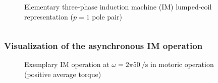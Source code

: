 \begin{frame}
\begin{columns}
\begin{column}{0.45\textwidth}
\begin{figure}
                \caption{Elementary three-phase induction machine (IM) lumped-coil representation ($p=1$ pole pair)}
                \label{fig:Simple_three_phase_induction_machine_lumped_coils}
            \end{figure}
        \end{column}
    \end{columns}
\end{frame}

\begin{frame}
	\frametitle{Visualization of the asynchronous IM operation}
    \vspace{-0.275cm}
    \begin{figure}
        \centering
        \vspace{-0.25cm}
        \caption{Exemplary IM operation at $\omega=2 \pi \SI{50}{\per\second}$ in motoric operation (positive average torque)}
        \label{fig:IM_slip_0_load_angle_90_animation}
    \end{figure}
\end{frame}

